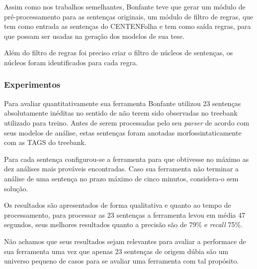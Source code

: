 Assim como nos trabalhos semelhantes, Bonfante teve que gerar um módulo de pré-processamento para as sentenças originais, um módulo de filtro de regras, que tem como entrada as sentenças do CENTENFolha e tem como saída regras, para que possam ser usadas na geração dos modelos de sua tese.

Além do filtro de regras foi preciso criar o filtro de núcleos de sentenças, os núcleos foram identificados para cada regra. 

\subsubsection{Experimentos} %
\label{sec:bonfante_experimentos}

Para avaliar quantitativamente sua ferramenta Bonfante utilizou 23 sentenças absolutamente inéditas no sentido de não terem sido observadas no treebank utilizado para treino. Antes de serem processadas pelo seu \emph{parser} de acordo com seus modelos de análise, estas sentenças foram anotadas morfossintaticamente com as TAGS do treebank.

Para cada sentença configurou-se a ferramenta para que obtivesse no máximo as dez análises mais prováveis encontradas. Caso sua ferramenta não terminar a análise de uma sentença no prazo máximo de cinco minutos, considera-o sem solução.

Os resultados são apresentados de forma qualitativa e quanto ao tempo de processamento, para processar as 23 sentenças a ferramenta levou em média 47 segundos, seus melhores resultados quanto a precisão são de 79{\%} e \emph{recall} 75{\%}.

Não achamos que seus resultados sejam relevantes para avaliar a performace de sua ferramenta uma vez que apenas 23 sentenças de origem dúbia são um universo pequeno de casos para se avaliar uma ferramenta com tal propósito.





